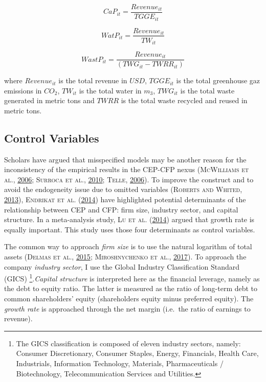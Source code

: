 \documentclass[12pt,]{article}
\let\rmarkdownfootnote\footnote%
\def\footnote{\protect\rmarkdownfootnote}
\begin{document}
\begin{equation}
CaP_{it} = \frac{Revenue_{it}}{TGGE_{it}}
\label{CaP}
\end{equation}

\begin{equation}
WatP_{it} = \frac{Revenue_{it}}{TW_{it}}
\label{WatP}
\end{equation}

\begin{equation}
WastP_{it} = \frac{Revenue_{it}}{(TWG_{it} - TWRR_{it})}
\label{WastP}
\end{equation}

where \(Revenue_{it}\) is the total revenue in \(USD\), \(TGGE_{it}\) is
the total greenhouse gaz emissions in \(CO_{2}\), \(TW_{it}\) is the
total water in \(m_{3}\), \(TWG_{it}\) is the total waste generated in
metric tons and \(TWRR\) is the total waste recycled and reused in
metric tons.

\subsection{Control Variables}\label{control-variables}

Scholars have argued that misspecified models may be another reason for
the inconsistency of the empirical results in the CEP-CFP nexus
(\textsc{McWilliams et al.},
\protect\hyperlink{ref-McWilliams2006}{2006}; \textsc{Surroca et al.},
\protect\hyperlink{ref-Surroca2010}{2010}; \textsc{Telle},
\protect\hyperlink{ref-Telle2006}{2006}). To improve the construct and
to avoid the endogeneity issue due to omitted variables (\textsc{Roberts
and Whited}, \protect\hyperlink{ref-Roberts2013}{2013}),
\textsc{Endrikat et al.}
(\protect\hyperlink{ref-EndrikatMakingsenseconflicting2014}{2014}) have
highlighted potential determinants of the relationship between CEP and
CFP: firm size, industry sector, and capital structure. In a
meta-analysis study, \textsc{Lu et al.}
(\protect\hyperlink{ref-Ludecadedebatenexus2014}{2014}) argued that
growth rate is equally important. This study uses those four
determinants as control variables.

The common way to approach \emph{firm size} is to use the natural
logarithm of total assets (\textsc{Delmas et al.},
\protect\hyperlink{ref-Delmas2015}{2015}; \textsc{Miroshnychenko et
al.},
\protect\hyperlink{ref-MiroshnychenkoGreenpracticesfinancial2017}{2017}).
To approach the company \emph{industry sector}, I use the Global
Industry Classification Standard (GICS)
\footnote{The GICS classification is composed of eleven industry sectors, namely: Consumer Discretionary, Consumer Staples, Energy, Financials, Health Care, Industrials, Information Technology, Materials, Pharmaceuticals / Biotechnology, Telecommunication Services and Utilities.}.\emph{Capital
structure} is interpreted here as the financial leverage, namely as the
debt to equity ratio. The latter is measured as the ratio of long-term
debt to common shareholders' equity (shareholders equity minus preferred
equity). The \emph{growth rate} is approached through the net margin
(i.e.~the ratio of earnings to revenue).
\end{document}
